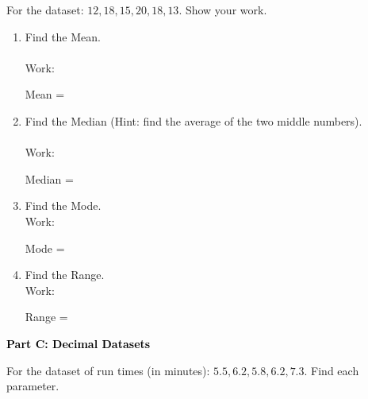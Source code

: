 \documentclass[12pt, letterpaper, fleqn]{article}
\newcommand{\blank}{\underline{\hspace{2.2cm}}}
\begin{document}
\vspace{3mm}

\noindent
For the dataset: $12, 18, 15, 20, 18, 13$. Show your work.

\vspace{5mm}

\begin{enumerate}[itemsep=1.3cm, leftmargin=0.6cm]
\item Find the Mean. \\ \\
Work: \quad  
\vspace{1cm}

Mean = \blank

\item Find the Median (Hint: find the average of the two middle numbers). \\ \\
Work: \quad  
\vspace{1cm}

Median = \blank

\item Find the Mode. \\
Work: \quad  
\vspace{1cm}

Mode = \blank

\item Find the Range. \\
Work: \quad  
\vspace{1cm}

Range = \blank
\end{enumerate}

\newpage

\begin{tcolorbox}[colback=black!10]
    \large\textcolor{black}{\textbf{Part C: Decimal Datasets}}
\end{tcolorbox}

\vspace{3mm}

\noindent
For the dataset of run times (in minutes): $5.5, 6.2, 5.8, 6.2, 7.3$. Find each parameter.

\vspace{5mm}
\end{document}

